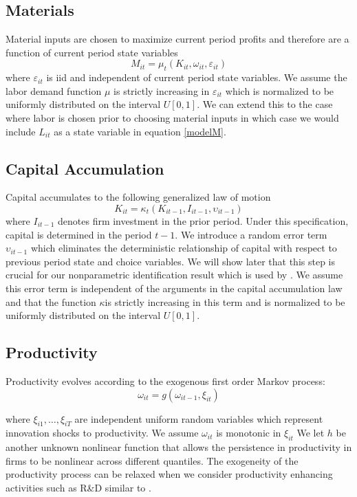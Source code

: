\documentclass{article}
\begin{document}
\subsection{Materials} 
Material inputs are chosen to maximize current period profits and therefore are a function of current period state variables
\begin{equation} \label{modelM}
M_{it}=\mu_{t}(K_{it}, \omega_{it}, \varepsilon_{it})
\end{equation}
where $\varepsilon_{it}$ is iid and independent of current period state variables. We assume the labor demand function $\mu$ is strictly increasing in $\varepsilon_{it}$ which is normalized to be uniformly distributed on the interval $U[0,1]$. We can extend this to the case where labor is chosen prior to choosing material inputs in which case we would include $L_{it}$ as a state variable in equation \eqref{modelM}.

\subsection{Capital Accumulation}
Capital accumulates to the following generalized law of motion
\begin{equation} \label{modelK}
K_{it}=\kappa_{t}(K_{it-1}, I_{it-1}, \upsilon_{it-1})
\end{equation}
where $I_{it-1}$ denotes firm investment in the prior period. Under this specification, capital is determined in the period $t-1$. We introduce a random error term $\upsilon_{it-1}$ which eliminates the deterministic relationship of capital with respect to previous period state and choice variables. We will show later that this step is crucial for our nonparametric identification result which is used by \cite{Hu2019}. We assume this error term is independent of the arguments in the capital accumulation law and that the function $\kappa$is strictly increasing in this term and is normalized to be uniformly distributed on the interval $U[0,1]$.

\subsection{Productivity}
Productivity evolves according to the exogenous first order Markov process:
\begin{equation}\label{modelw}
\omega_{it}=g(\omega_{it-1}, \xi_{it})
\end{equation}

where $\xi_{i1},\dots, \xi_{iT}$ are independent uniform random variables which represent innovation shocks to productivity. We assume $\omega_{it}$ is monotonic in $\xi_{it}$ We let $h$ be another unknown nonlinear function that allows the persistence in productivity in firms to be nonlinear across different quantiles. The exogeneity of the productivity process can be relaxed when we consider productivity enhancing activities such as R\&D similar to \cite{Doraszelski2013}.
\end{document}
